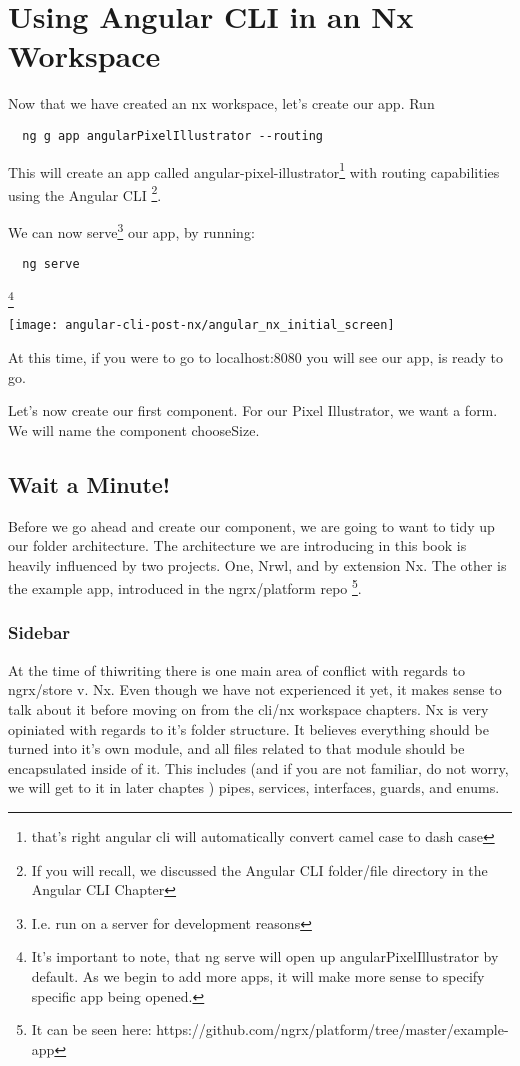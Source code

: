 \maketitle{}
\section{ Using Angular CLI in an Nx Workspace }

Now that we have created an nx workspace, let's create our app. Run
\begin{verbatim}
  ng g app angularPixelIllustrator --routing
\end{verbatim}

This will create an app called angular-pixel-illustrator\footnote{that's right
angular cli will automatically convert camel case to dash case} with routing
capabilities using the Angular CLI \footnote{If you will recall, we discussed
the Angular CLI folder/file directory in the Angular CLI Chapter}.

We can now serve\footnote{I.e. run on a server for development reasons} our app,
by running:
\begin{verbatim}
  ng serve
\end{verbatim} \footnote{It's important to note, that ng serve will open up
angularPixelIllustrator by default. As we begin to add more apps, it will make
more sense to specify specific app being opened.}


\texttt{[image: angular-cli-post-nx/angular\_nx\_initial\_screen]}

At this time, if you were to go to localhost:8080 you will see our app, is
ready to go.

Let's now create our first component. For our Pixel Illustrator, we want a form.
We will name the component chooseSize.

\subsection {Wait a Minute!}
Before we go ahead and create our component, we are going to want to tidy up
our folder architecture. The architecture we are introducing in this book is
heavily influenced by two projects. One, Nrwl, and by extension Nx. The other is
the example app, introduced in the ngrx/platform repo \footnote{It can be seen
here: https://github.com/ngrx/platform/tree/master/example-app}.

\subsubsection {Sidebar}
At the time of thiwriting there is one main area of conflict with regards to
ngrx/store v. Nx. Even though we have not experienced it yet, it makes sense to
talk about it before moving on from the cli/nx workspace chapters. Nx is very
opiniated with regards to it's folder structure. It believes everything should
be turned into it's own module, and all files related to that module should
be encapsulated inside of it. This includes (and if you are not familiar, do not
worry, we will get to it in later chaptes ) pipes, services, interfaces, guards,
and enums.

